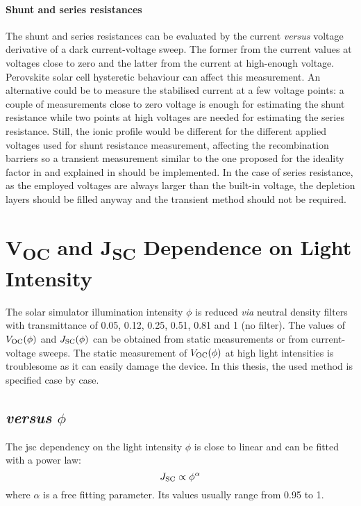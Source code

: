 	\paragraph{Shunt and series resistances} \label{resistances}
	The shunt and series resistances can be evaluated by the current \textsl{versus} voltage derivative of a dark current-voltage sweep.
	The former from the current values at voltages close to zero and the latter from the current at high-enough voltage.
	Perovskite solar cell hysteretic behaviour can affect this measurement.
	An alternative could be to measure the stabilised current at a few voltage points: a couple of measurements close to zero voltage is enough for estimating the shunt resistance while two points at high voltages are needed for estimating the series resistance.
	Still, the ionic profile would be different for the different applied voltages used for shunt resistance measurement, affecting the recombination barriers \cite{Moia2019,Pockett2017} so a transient measurement similar to the one proposed for the ideality factor in \cite{Calado2018b} and explained in  should be implemented.
	In the case of series resistance, as the employed voltages are always larger than the built-in voltage, the depletion layers should be filled anyway and the transient method should not be required.

\section{V\textsubscript{OC} and J\textsubscript{SC} Dependence on Light Intensity}
	The solar simulator illumination intensity $\phi$ is reduced \textsl{via} neutral density filters with transmittance of 0.05, 0.12, 0.25, 0.51, 0.81 and 1 (no filter).
	The values of $V_\mathrm{OC}(\phi)$ and $J_\mathrm{SC}(\phi)$ can be obtained from static measurements or from current-voltage sweeps.
	The static measurement of $V_\mathrm{OC}(\phi)$ at high light intensities is troublesome as it can easily damage the device.
	In this thesis, the used method is specified case by case.

	\subsection{ \textsl{versus} $\phi$}\label{jsc-phi}
		The \gls{jsc} dependency on the light intensity $\phi$ is close to linear and can be fitted with a power law:
		\begin{equation} \label{eq:jsc-phi}
			J_\mathrm{SC} \propto \phi^\alpha
		\end{equation}
		where $\alpha$ is a free fitting parameter. Its values usually range from 0.95 to 1.

